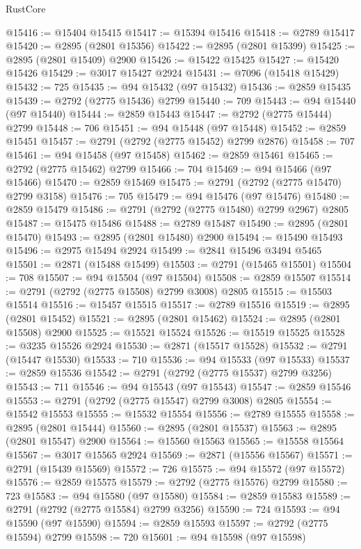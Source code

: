 \begin{lexlean}{RustCore}
\begin{coremodule}
@15416 := @15404 @15415
@15417 := @15394 @15416
@15418 := @2789 @15417
@15420 := @2895 (@2801 @15356)
@15422 := @2895 (@2801 @15399)
@15425 := @2895 (@2801 @15409) @2900
@15426 := @15422 @15425
@15427 := @15420 @15426
@15429 := @3017 @15427 @2924
@15431 := @7096 (@15418 @15429)
@15432 := 725
@15435 := @94 @15432 (@97 @15432)
@15436 := @2859 @15435
@15439 := @2792 (@2775 @15436) @2799
@15440 := 709
@15443 := @94 @15440 (@97 @15440)
@15444 := @2859 @15443
@15447 := @2792 (@2775 @15444) @2799
@15448 := 706
@15451 := @94 @15448 (@97 @15448)
@15452 := @2859 @15451
@15457 := @2791 (@2792 (@2775 @15452) @2799 @2876)
@15458 := 707
@15461 := @94 @15458 (@97 @15458)
@15462 := @2859 @15461
@15465 := @2792 (@2775 @15462) @2799
@15466 := 704
@15469 := @94 @15466 (@97 @15466)
@15470 := @2859 @15469
@15475 := @2791 (@2792 (@2775 @15470) @2799 @3158)
@15476 := 705
@15479 := @94 @15476 (@97 @15476)
@15480 := @2859 @15479
@15486 := @2791 (@2792 (@2775 @15480) @2799 @2967) @2805
@15487 := @15475 @15486
@15488 := @2789 @15487
@15490 := @2895 (@2801 @15470)
@15493 := @2895 (@2801 @15480) @2900
@15494 := @15490 @15493
@15496 := @2975 @15494 @2924
@15499 := @2841 @15496 @3494 @5465
@15501 := @2871 (@15488 @15499)
@15503 := @2791 (@15465 @15501)
@15504 := 708
@15507 := @94 @15504 (@97 @15504)
@15508 := @2859 @15507
@15514 := @2791 (@2792 (@2775 @15508) @2799 @3008) @2805
@15515 := @15503 @15514
@15516 := @15457 @15515
@15517 := @2789 @15516
@15519 := @2895 (@2801 @15452)
@15521 := @2895 (@2801 @15462)
@15524 := @2895 (@2801 @15508) @2900
@15525 := @15521 @15524
@15526 := @15519 @15525
@15528 := @3235 @15526 @2924
@15530 := @2871 (@15517 @15528)
@15532 := @2791 (@15447 @15530)
@15533 := 710
@15536 := @94 @15533 (@97 @15533)
@15537 := @2859 @15536
@15542 := @2791 (@2792 (@2775 @15537) @2799 @3256)
@15543 := 711
@15546 := @94 @15543 (@97 @15543)
@15547 := @2859 @15546
@15553 := @2791 (@2792 (@2775 @15547) @2799 @3008) @2805
@15554 := @15542 @15553
@15555 := @15532 @15554
@15556 := @2789 @15555
@15558 := @2895 (@2801 @15444)
@15560 := @2895 (@2801 @15537)
@15563 := @2895 (@2801 @15547) @2900
@15564 := @15560 @15563
@15565 := @15558 @15564
@15567 := @3017 @15565 @2924
@15569 := @2871 (@15556 @15567)
@15571 := @2791 (@15439 @15569)
@15572 := 726
@15575 := @94 @15572 (@97 @15572)
@15576 := @2859 @15575
@15579 := @2792 (@2775 @15576) @2799
@15580 := 723
@15583 := @94 @15580 (@97 @15580)
@15584 := @2859 @15583
@15589 := @2791 (@2792 (@2775 @15584) @2799 @3256)
@15590 := 724
@15593 := @94 @15590 (@97 @15590)
@15594 := @2859 @15593
@15597 := @2792 (@2775 @15594) @2799
@15598 := 720
@15601 := @94 @15598 (@97 @15598)

\end{coremodule}
\end{lexlean}
